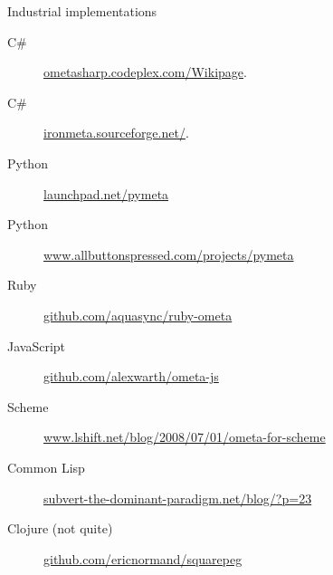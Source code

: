 \documentclass[presentation,10pt]{beamer}
\begin{document}
\begin{frame}[label=sec-3-2]{Industrial implementations}
\begin{description}
\item[{C\#}] \href{http://ometasharp.codeplex.com/Wikipage}{ometasharp.codeplex.com/Wikipage}.
\item[{C\#}] \href{http://ironmeta.sourceforge.net/}{ironmeta.sourceforge.net/}.
\item[{Python}] \href{https://launchpad.net/pymeta}{launchpad.net/pymeta}
\item[{Python}] \href{http://www.allbuttonspressed.com/projects/pymeta}{www.allbuttonspressed.com/projects/pymeta}
\item[{Ruby}] \href{http://github.com/aquasync/ruby-ometa/tree/master}{github.com/aquasync/ruby-ometa}
\item[{JavaScript}] \href{https://github.com/alexwarth/ometa-js}{github.com/alexwarth/ometa-js}
\item[{Scheme}] \href{http://www.lshift.net/blog/2008/07/01/ometa-for-scheme}{www.lshift.net/blog/2008/07/01/ometa-for-scheme}
\item[{Common Lisp}] \href{http://subvert-the-dominant-paradigm.net/blog/?p\%3D23}{subvert-the-dominant-paradigm.net/blog/?p=23}
\item[{Clojure (not quite)}] \href{https://github.com/ericnormand/squarepeg}{github.com/ericnormand/squarepeg}
\end{description}
\end{frame}
\end{document}
